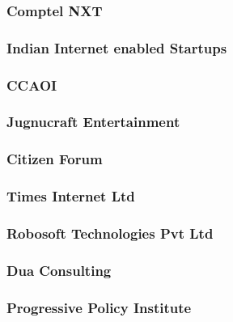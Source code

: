 \documentclass{article}
\begin{document}
\subsubsection{Comptel NXT}


\subsubsection{Indian Internet enabled Startups}


\subsubsection{CCAOI}


\subsubsection{Jugnucraft Entertainment}


\subsubsection{Citizen Forum}


\subsubsection{Times Internet Ltd}


\subsubsection{Robosoft Technologies Pvt Ltd}


\subsubsection{Dua Consulting}


\subsubsection{Progressive Policy Institute}

\end{document}
